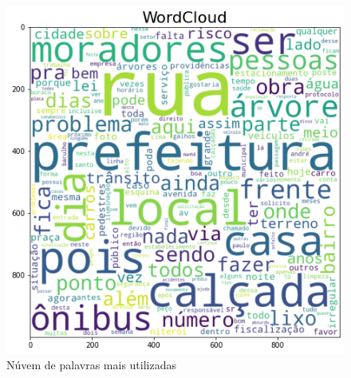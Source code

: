 \begin{figure}[!htb]
	\caption{Núvem de palavras mais utilizadas}
	\label{fig:wordcloud}
	\centering
	\includegraphics[scale=0.5]{images/wordcloud.png}
	\fautor
\end{figure}

